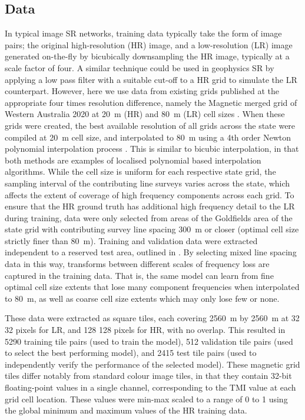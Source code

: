 \subsection{Data}
In typical image SR networks, training data typically take the form of image pairs; the original high-resolution (HR) image, and a low-resolution (LR) image generated on-the-fly by bicubically downsampling the HR image, typically at a scale factor of four.
A similar technique could be used in geophysics SR by applying a low pass filter with a suitable cut-off to a HR grid to simulate the LR counterpart.
However, here we use data from existing grids published at the appropriate four times resolution difference, namely the Magnetic merged grid of Western Australia 2020 at \qty{20}{\metre} (HR) and \qty{80}{\metre} (LR) cell sizes \parencite{brett80MagneticMerged2020}.
When these grids were created, the best available resolution of all grids across the state were compiled at \qty{20}{\metre} cell size, and interpolated to \qty{80}{\metre} using a 4th order Newton polynomial interpolation process \parencite[][personal communication]{brett80MagneticMerged2020}.
This is similar to bicubic interpolation, in that both methods are examples of localised polynomial based interpolation algorithms.
While the cell size is uniform for each respective state grid, the sampling interval of the contributing line surveys varies across the state, which affects the extent of coverage of high frequency components across each grid.
To ensure that the HR ground truth has additional high frequency detail to the LR during training, data were only selected from areas of the Goldfields area of the state grid with contributing survey line spacing \qty{300}{\metre} or closer (optimal cell size strictly finer than \qty{80}{\metre}).
Training and validation data were extracted independent to a reserved test area, outlined in .
By selecting mixed line spacing data in this way, transforms between different scales of frequency loss are captured in the training data.
That is, the same model can learn from fine optimal cell size extents that lose many component frequencies when interpolated to \qty{80}{\metre}, as well as coarse cell size extents which may only lose few or none.

These data were extracted as square tiles, each covering \qty{2560}{\metre} by \qty{2560}{\metre} at 32 \texttimes{} 32 pixels for LR, and 128 \texttimes{} 128 pixels for HR, with no overlap.
This resulted in \num{5290} training tile pairs (used to train the model), \num{512} validation tile pairs (used to select the best performing model), and \num{2415} test tile pairs (used to independently verify the performance of the selected model).
These magnetic grid tiles differ notably from standard colour image tiles, in that they contain 32-bit floating-point values in a single channel, corresponding to the TMI value at each grid cell location.
These values were min-max scaled to a range of 0 to 1 using the global minimum and maximum values of the HR training data.


